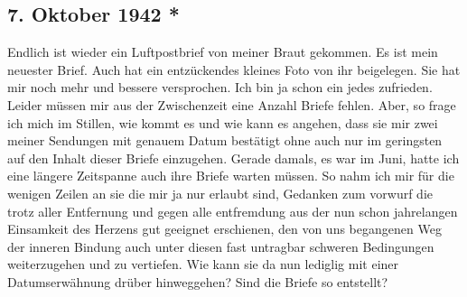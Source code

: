 \subsection{7. Oktober 1942 *}

Endlich ist wieder ein Luftpostbrief von meiner Braut gekommen.
Es ist mein neuester Brief.
Auch hat ein entz\"{u}ckendes kleines Foto von ihr beigelegen.
Sie hat mir noch mehr und bessere versprochen.
Ich bin ja schon ein jedes zufrieden.
Leider m\"{u}ssen mir aus der Zwischenzeit eine Anzahl Briefe fehlen.
Aber, so frage ich mich im Stillen, wie kommt es und wie kann es angehen, dass sie mir zwei meiner Sendungen mit genauem Datum best\"{a}tigt ohne auch nur im geringsten auf den Inhalt dieser Briefe einzugehen.
Gerade damals, es war im Juni, hatte ich eine l\"{a}ngere Zeitspanne auch ihre Briefe warten m\"{u}ssen.
So nahm ich mir f\"{u}r die wenigen Zeilen an sie die mir ja nur erlaubt sind, Gedanken zum vorwurf die trotz aller Entfernung und gegen alle entfremdung aus der nun schon jahrelangen Einsamkeit des Herzens gut geeignet erschienen, den von uns begangenen Weg der inneren Bindung auch unter diesen fast untragbar schweren Bedingungen weiterzugehen und zu vertiefen.
Wie kann sie da nun lediglig mit einer Datumserw\"{a}hnung dr\"{u}ber hinweggehen?
Sind die Briefe so entstellt?

\clearpage
